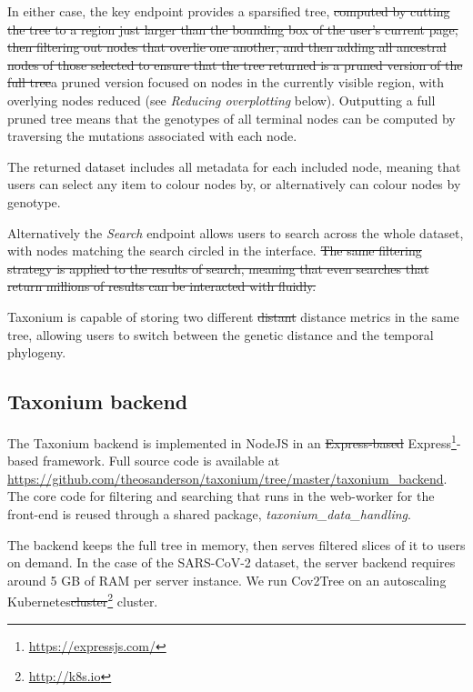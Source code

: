 \documentclass[twocolumn]{bioRxiv}
\providecommand{\DIFadd}[1]{{\protect\color{teal}#1}}
\providecommand{\DIFdel}[1]{{\protect\color{red}\sout{#1}}}
\providecommand{\DIFaddbegin}{}
\providecommand{\DIFaddend}{}
\providecommand{\DIFdelbegin}{}
\providecommand{\DIFdelend}{}
\begin{document}
In either case, the key endpoint provides a sparsified tree, \DIFdelbegin \DIFdel{computed by cutting the tree to a region just larger than the bounding box of the user's current page, then filtering out nodes that overlie one another, and then adding all ancestral nodes of those selected to ensure that the tree returned is a pruned version of the full tree}\DIFdelend \DIFaddbegin \DIFadd{a pruned version focused on nodes in the currently visible region, with overlying nodes reduced (see }\textit{\DIFadd{Reducing overplotting}} \DIFadd{below)}\DIFaddend . Outputting a full pruned tree means that the genotypes of all terminal nodes can be computed by traversing the mutations associated with each node.

The returned dataset includes all metadata for each included node, meaning that users can select any item to colour nodes by, or alternatively can colour nodes by genotype.

Alternatively the \emph{Search} endpoint allows users to search across the whole dataset, with nodes matching the search circled in the interface.
\DIFdelbegin \DIFdel{The same filtering strategy is applied to the results of search, meaning that even searches that return millions of results can be interacted with fluidly.
}\DIFdelend 

Taxonium is capable of storing two different \DIFdelbegin \DIFdel{distant }\DIFdelend \DIFaddbegin \DIFadd{distance }\DIFaddend metrics in the same tree, allowing users to switch between the genetic distance and the temporal phylogeny. 




\subsection*{Taxonium backend}
The Taxonium backend is implemented in NodeJS in an \DIFdelbegin \DIFdel{Express-based }\DIFdelend \DIFaddbegin \DIFadd{Express}\footnote{\url{https://expressjs.com/}}\DIFadd{-based }\DIFaddend framework. Full source code is available at \url{https://github.com/theosanderson/taxonium/tree/master/taxonium_backend}. The core code for filtering and searching that runs in the web-worker for the front-end is reused through a shared package, \emph{taxonium\_data\_handling}.

The backend keeps the full tree in memory, then serves filtered slices of it to users on demand. In the case of the SARS-CoV-2 dataset, the server backend requires around 5 GB of RAM per server instance. We run Cov2Tree on an autoscaling Kubernetes\DIFdelbegin \DIFdel{cluster}\DIFdelend \DIFaddbegin \footnote{\url{http://k8s.io}} \DIFadd{cluster.
}
\end{document}
